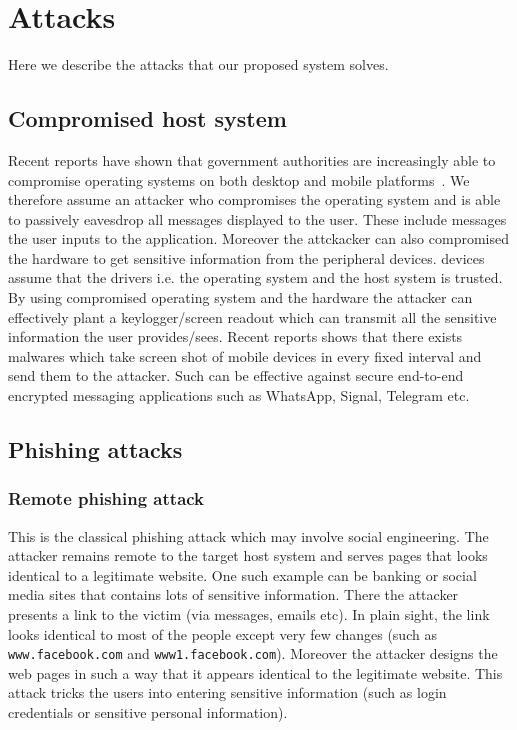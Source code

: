 \section{Attacks}
\label{sec:attacks}
 
Here we describe the attacks that our proposed system \toolname solves.

\subsection{Compromised host system}

Recent reports have shown that government authorities are increasingly able to compromise operating systems on both desktop and mobile platforms~\cite{}.
We therefore assume an attacker who compromises the operating system and is able to passively eavesdrop all messages displayed to the user.
These include messages the user inputs to the application. Moreover the attckacker can also compromised the hardware to get sensitive information from the peripheral devices. \usb devices assume that the \usb drivers i.e. the operating system and the host system is trusted. By using compromised operating system and the hardware the attacker can effectively plant a keylogger/screen readout which can transmit all the sensitive information the user provides/sees. Recent reports shows that there exists malwares which take screen shot of mobile devices in every fixed interval and send them to the attacker. Such can be effective against secure end-to-end encrypted messaging applications such as WhatsApp, Signal, Telegram etc.



\subsection{Phishing attacks}
\label{sec:attacks:phishing}

\subsubsection{Remote phishing attack} 
\label{sec:attacks:remotePhishing}

This is the classical phishing attack which may involve social engineering. The attacker remains remote to the target host system and serves pages that looks identical to a legitimate website. One such example can be banking or social media sites that contains lots of sensitive information. There the attacker presents a link to the victim (via messages, emails etc). In plain sight, the link looks identical to most of the people except very few changes (such as \texttt{www.facebook.com} and \texttt{www1.facebook.com}). Moreover the attacker designs the web pages in such a way that it appears identical to the legitimate website. This attack tricks the users into entering sensitive information (such as login credentials or sensitive personal information).

